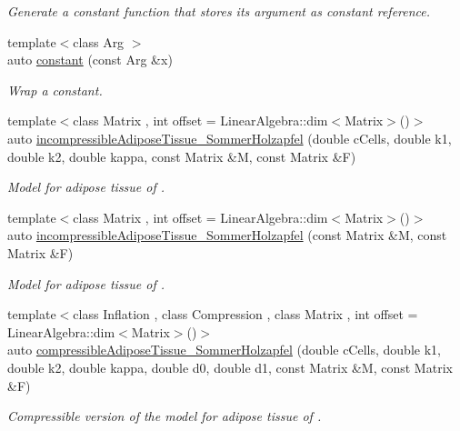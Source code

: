 \begin{DoxyCompactItemize}
\begin{DoxyCompactList}\small\item\em Generate a constant function that stores its argument as constant reference. \end{DoxyCompactList}\item 
{\footnotesize template$<$class Arg $>$ }\\auto \hyperlink{namespaceFunG_a65c509062b62b3303268cabc97b75a65}{constant} (const Arg \&x)
\begin{DoxyCompactList}\small\item\em Wrap a constant. \end{DoxyCompactList}\item 
{\footnotesize template$<$class Matrix , int offset = Linear\+Algebra\+::dim$<$\+Matrix$>$()$>$ }\\auto \hyperlink{group__Biomechanics_gac269eefc1abb994044e1634c20a98061}{incompressible\+Adipose\+Tissue\+\_\+\+Sommer\+Holzapfel} (double c\+Cells, double k1, double k2, double kappa, const Matrix \&M, const Matrix \&F)
\begin{DoxyCompactList}\small\item\em Model for adipose tissue of \cite{Sommer2013}. \end{DoxyCompactList}\item 
{\footnotesize template$<$class Matrix , int offset = Linear\+Algebra\+::dim$<$\+Matrix$>$()$>$ }\\auto \hyperlink{group__Biomechanics_ga01ab128bcf179f4431b0270179af9e20}{incompressible\+Adipose\+Tissue\+\_\+\+Sommer\+Holzapfel} (const Matrix \&M, const Matrix \&F)
\begin{DoxyCompactList}\small\item\em Model for adipose tissue of \cite{Sommer2013}. \end{DoxyCompactList}\item 
{\footnotesize template$<$class Inflation , class Compression , class Matrix , int offset = Linear\+Algebra\+::dim$<$\+Matrix$>$()$>$ }\\auto \hyperlink{group__Biomechanics_ga5c3388564c0420b62e58f48c739d27f1}{compressible\+Adipose\+Tissue\+\_\+\+Sommer\+Holzapfel} (double c\+Cells, double k1, double k2, double kappa, double d0, double d1, const Matrix \&M, const Matrix \&F)
\begin{DoxyCompactList}\small\item\em Compressible version of the model for adipose tissue of \cite{Sommer2013}. \end{DoxyCompactList}\item 

\end{DoxyCompactItemize}
